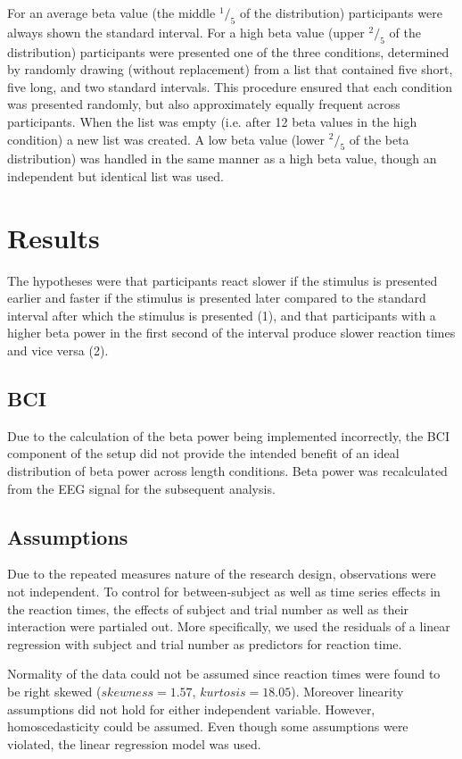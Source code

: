 \documentclass[man,floatsintext]{apa6} %
\begin{document}
For an average beta value (the middle $^1/_5$ of the
distribution) participants were always shown the standard
interval. For a high beta value (upper $^2/_5$ of the
distribution) participants were presented one of the three conditions,
determined by randomly drawing (without replacement) from a list that
contained five short, five long, and two standard intervals. This
procedure ensured that each condition was presented randomly, but also
approximately equally frequent across participants. When the list was
empty (i.e. after 12 beta values in the high condition) a new list was
created. A low beta value (lower $^2/_5$ of the beta
distribution) was handled in the same manner as a high beta value,
though an independent but identical list was used.



\section{Results}
The hypotheses were that participants react slower if the stimulus is
presented earlier and faster if the stimulus is presented later
compared to the standard interval after which the stimulus is
presented (1), and that participants with a higher beta power in the
first second of the interval produce slower reaction times and vice
versa (2).

\subsection{BCI}
Due to the calculation of the beta power being implemented
incorrectly, the BCI component of the setup did not provide the
intended benefit of an ideal distribution of beta power across length
conditions. Beta power was recalculated from the EEG signal for the
subsequent analysis.

\subsection{Assumptions}
Due to the repeated measures nature of the research design,
observations were not independent. To control for between-subject as
well as time series effects in the reaction times, the effects of
subject and trial number as well as their interaction were partialed
out. More specifically, we used the residuals of a linear regression
with subject and trial number as predictors for reaction time.

Normality of the data could not be assumed since reaction times were
found to be right skewed ($skewness = 1.57$, $kurtosis =
18.05$). Moreover linearity assumptions did not hold for either
independent variable. However, homoscedasticity could be assumed. Even
though some assumptions were violated, the linear regression model was
used.
\end{document}
